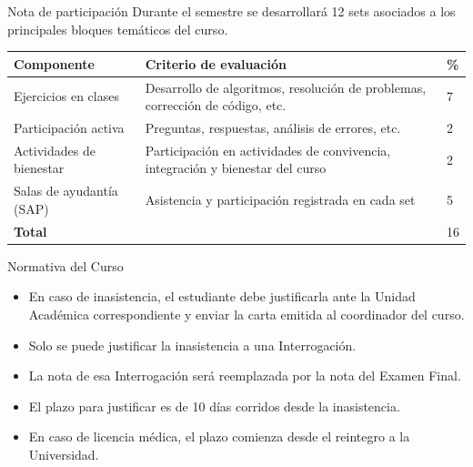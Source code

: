 \documentclass{beamer}
\begin{document}
    \begin{frame}{Nota de participación}
        Durante el semestre se desarrollará 12 sets asociados a los principales
        bloques temáticos del curso.
        
        \begin{tabular}{|p{2.5cm}|p{6.1cm}|p{0.4cm}|}
            \hline
            \textbf{Componente} & \textbf{Criterio de evaluación} & \textbf{\%} \\ \hline
            Ejercicios en clases & Desarrollo de algoritmos, resolución de problemas,
            corrección de código, etc. & 7 \\ \hline
            Participación activa & Preguntas, respuestas, análisis de errores,
             etc. & 2 \\ \hline
            Actividades de bienestar & Participación en actividades de convivencia, 
            integración y bienestar del curso & 2 \\ \hline
            Salas de ayudantía (SAP) & Asistencia y participación registrada en cada
            set & 5 \\ \hline
            \textbf{Total} & & 16 \\ \hline
        \end{tabular}
    \end{frame}

    \begin{frame}[label=normativa]{Normativa del Curso}
        
        \begin{itemize}
            \item En caso de inasistencia, el estudiante debe justificarla ante la
            Unidad Académica correspondiente y enviar la carta emitida al
            coordinador del curso.
            \item Solo se puede justificar la inasistencia a una Interrogación.
            \item La nota de esa Interrogación será reemplazada por la nota del Examen Final.
            \item El plazo para justificar es de 10 días corridos desde la inasistencia.
            \item En caso de licencia médica, el plazo comienza desde el reintegro
            a la Universidad.
        \end{itemize}
        
    \end{frame}
\end{document}
